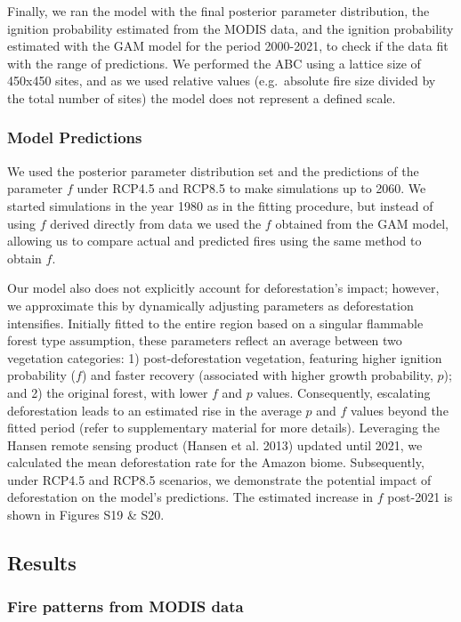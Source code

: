 \documentclass[
]{article}
\begin{document}
Finally, we ran the model with the final posterior parameter
distribution, the ignition probability estimated from the MODIS data,
and the ignition probability estimated with the GAM model for the period
2000-2021, to check if the data fit with the range of predictions. We
performed the ABC using a lattice size of 450x450 sites, and as we used
relative values (e.g.~absolute fire size divided by the total number of
sites) the model does not represent a defined scale.

\subsubsection{Model Predictions}\label{model-predictions}

We used the posterior parameter distribution set and the predictions of
the parameter \(f\) under RCP4.5 and RCP8.5 to make simulations up to
2060. We started simulations in the year 1980 as in the fitting
procedure, but instead of using \(f\) derived directly from data we used
the \(f\) obtained from the GAM model, allowing us to compare actual and
predicted fires using the same method to obtain \(f\).

Our model also does not explicitly account for deforestation's impact;
however, we approximate this by dynamically adjusting parameters as
deforestation intensifies. Initially fitted to the entire region based
on a singular flammable forest type assumption, these parameters reflect
an average between two vegetation categories: 1) post-deforestation
vegetation, featuring higher ignition probability (\(f\)) and faster
recovery (associated with higher growth probability, \(p\)); and 2) the
original forest, with lower \(f\) and \(p\) values. Consequently,
escalating deforestation leads to an estimated rise in the average \(p\)
and \(f\) values beyond the fitted period (refer to supplementary
material for more details). Leveraging the Hansen remote sensing product
(Hansen et al. 2013) updated until 2021, we calculated the mean
deforestation rate for the Amazon biome. Subsequently, under RCP4.5 and
RCP8.5 scenarios, we demonstrate the potential impact of deforestation
on the model's predictions. The estimated increase in \(f\) post-2021 is
shown in Figures S19 \& S20.

\subsection{Results}\label{results}

\subsubsection{Fire patterns from MODIS
data}\label{fire-patterns-from-modis-data}
\end{document}
